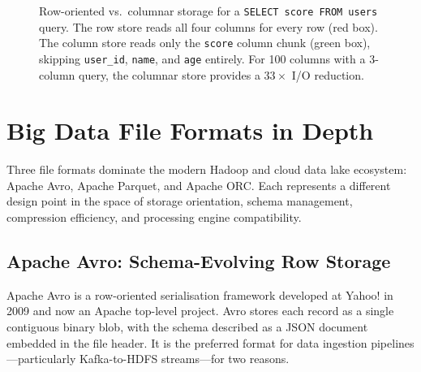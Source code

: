 \begin{figure}[h!t]
\caption{Row-oriented vs.\ columnar storage for a \texttt{SELECT score FROM users}
         query. The row store reads all four columns for every row (red box).
         The column store reads only the \texttt{score} column chunk (green box),
         skipping \texttt{user\_id}, \texttt{name}, and \texttt{age} entirely.
         For 100 columns with a 3-column query, the columnar store provides a
         $33\times$ I/O reduction.}
\label{fig:row-vs-column}
\end{figure}

\section{Big Data File Formats in Depth}
\label{sec:file-formats}

Three file formats dominate the modern Hadoop and cloud data lake
ecosystem: Apache Avro, Apache Parquet, and Apache ORC. Each represents
a different design point in the space of storage orientation, schema
management, compression efficiency, and processing engine compatibility.

\subsection{Apache Avro: Schema-Evolving Row Storage}
\label{subsec:avro}

Apache Avro is a row-oriented serialisation framework developed at
Yahoo! in 2009 and now an Apache top-level project. Avro stores each
record as a single contiguous binary blob, with the schema described
as a JSON document embedded in the file header. It is the preferred
format for data ingestion pipelines---particularly Kafka-to-HDFS
streams---for two reasons.

